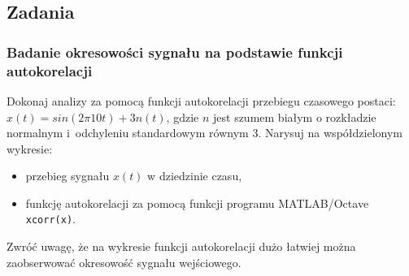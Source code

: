 \subsection{Zadania}

\subsubsection{Badanie okresowości sygnału na podstawie funkcji autokorelacji}
Dokonaj analizy za pomocą funkcji autokorelacji przebiegu czasowego postaci: $x(t) = sin(2\pi10t) + 3n(t)$, gdzie $n$ jest szumem białym o rozkładzie normalnym i~odchyleniu standardowym równym $3$. Narysuj na współdzielonym wykresie:
\begin{itemize}
	\item przebieg sygnału $x(t)$ w dziedzinie czasu,
	\item funkcję autokorelacji za pomocą funkcji programu MATLAB/Octave \texttt{xcorr(x)}.
\end{itemize}

Zwróć uwagę, że na wykresie funkcji autokorelacji dużo łatwiej można zaobserwować okresowość sygnału wejściowego. 

